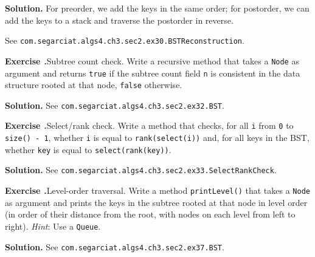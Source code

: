 \documentclass[12pt, a4paper]{article}
\newenvironment{ex}[2][Exercise]
{\par\medskip\noindent \textbf{#1 #2.}}
{\medskip}
\newenvironment{sol}[1][Solution]
{\par\medskip\noindent \textbf{#1.} }
{\medskip}
\begin{document}
	\begin{sol}
		For preorder, we add the keys in the same order; for postorder, we can add
		the keys to a stack and traverse the postorder in reverse.
		
		See \texttt{com.segarciat.algs4.ch3.sec2.ex30.BSTReconstruction}.
	\end{sol}
	\begin{ex}{32}
		\emph{Subtree count check}. Write a recursive method that takes a \texttt{Node}
		as argument and returns \texttt{true} if the subtree count field \texttt{n} is
		consistent in the data structure rooted at that node, \texttt{false} otherwise.
	\end{ex}
	\begin{sol}
		See \texttt{com.segarciat.algs4.ch3.sec2.ex32.BST}.
	\end{sol}
	\begin{ex}{33}
		\emph{Select/rank check}. Write a method that checks, for all \texttt{i} from \texttt{0}
		to \texttt{size() - 1}, whether \texttt{i} is equal to \texttt{rank(select(i))} and,
		for all keys in the BST, whether \texttt{key} is equal to \texttt{select(rank(key))}.
	\end{ex}
	\begin{sol}
		See \texttt{com.segarciat.algs4.ch3.sec2.ex33.SelectRankCheck}.
	\end{sol}
	\begin{ex}{37}
		\emph{Level-order traversal}. Write a method \texttt{printLevel()} that takes
		a \texttt{Node} as argument and prints the keys in the subtree rooted at that
		node in level order (in order of their distance from the root, with nodes
		on each level from left to right). \emph{Hint}: Use a \texttt{Queue}.
	\end{ex}
	\begin{sol}
		See \texttt{com.segarciat.algs4.ch3.sec2.ex37.BST}.
	\end{sol}
	\pagebreak
	\printbibliography
\end{document}
